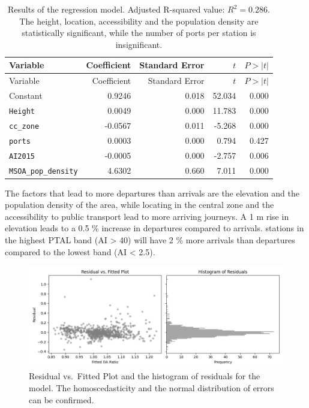 \documentclass[
  a4paper,
  DIV=11,
  numbers=noendperiod]{scrartcl}
\begin{document}
\begin{longtable}[]{@{}lrrrr@{}}
\caption{Results of the regression model. Adjusted R-squared value:
\(R^2 = 0.286\). The height, location, accessibility and the population
density are statistically significant, while the number of ports per
station is insignificant.}\tabularnewline
\toprule\noalign{}
Variable & Coefficient & Standard Error & \(t\) & \(P > |t|\) \\
\midrule\noalign{}
\endfirsthead
\toprule\noalign{}
Variable & Coefficient & Standard Error & \(t\) & \(P > |t|\) \\
\midrule\noalign{}
\endhead
\bottomrule\noalign{}
\endlastfoot
Constant & 0.9246 & 0.018 & 52.034 & 0.000 \\
\texttt{Height} & 0.0049 & 0.000 & 11.783 & 0.000 \\
\texttt{cc\_zone} & -0.0567 & 0.011 & -5.268 & 0.000 \\
\texttt{ports} & 0.0003 & 0.000 & 0.794 & 0.427 \\
\texttt{AI2015} & -0.0005 & 0.000 & -2.757 & 0.006 \\
\texttt{MSOA\_pop\_density} & 4.6302 & 0.660 & 7.011 & 0.000 \\
\end{longtable}

The factors that lead to more departures than arrivals are the elevation
and the population density of the area, while locating in the central
zone and the accessibility to public transport lead to more arriving
journeys. A 1 m rise in elevation leads to a 0.5 \% increase in
departures compared to arrivals. stations in the highest PTAL band (AI
\textgreater{} 40) will have 2 \% more arrivals than departures compared
to the lowest band (AI \textless{} 2.5).

\begin{figure}

{\centering \includegraphics{img/residual_DA.png}

}

\caption{Residual vs.~Fitted Plot and the histogram of residuals for the
model. The homoscedasticity and the normal distribution of errors can be
confirmed.}

\end{figure}
\end{document}
